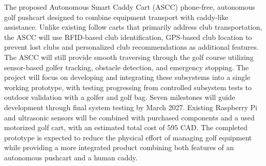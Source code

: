 \label{sec:conclusion}

The proposed Autonomous Smart Caddy Cart (ASCC) phone-free, autonomous golf pushcart designed to combine equipment transport with caddy-like assistance. Unlike existing follow carts that primarily address club transportation, the ASCC will use RFID-based club identification, GPS-based club location to prevent lost clubs and personalized club recommendations as additional features. The ASCC will still provide smooth traversing through the golf course utilizing sensor-based golfer tracking, obstacle detection, and emergency stopping. The project will focus on developing and integrating these subsystems into a single working prototype, with testing progressing from controlled subsystem tests to outdoor validation with a golfer and golf bag. Seven milestones will guide development through final system testing by March 2027. Existing Raspberry Pi and ultrasonic sensors will be combined with purchased components and a used motorized golf cart, with an estimated total cost of 595 CAD. The completed prototype is expected to reduce the physical effort of managing golf equipment while providing a more integrated product combining both features of an autonomous pushcart and a human caddy.
\label{ProposalBodyEnd}
\clearpage
